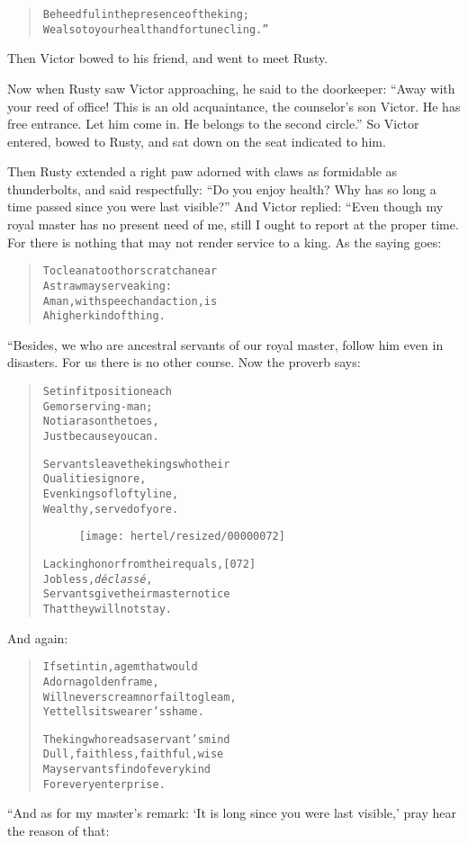 \documentclass[article, twoside, 10pt]{memoir}
\renewenvironment{verbatim}{%
\begin{quote}%
\vskip -10pt%
\begin{alltt}\normalfont\small}{\end{alltt}%
\end{quote}%
\vskip -10pt
} %
\begin{document}
\begin{verbatim}
Be heedful in the presence of the king;
We also to your health and fortune cling.”
\end{verbatim}
Then Victor bowed to his friend, and went to meet Rusty.

Now when Rusty saw Victor approaching, he said to the doorkeeper:
``Away with your reed of office! This is an old acquaintance, the counselor's son Victor. He has free entrance. Let him come in. He belongs to the second circle.''
So Victor entered, bowed to Rusty, and sat down on the seat
indicated to him.

Then Rusty extended a right paw adorned with claws as formidable as
thunderbolts, and said respectfully:
``Do you enjoy health? Why has so long a time passed since you were last visible?''
And Victor replied: “Even though my royal master has no present
need of me, still I ought to report at the proper time. For there
is nothing that may not render service to a king. As the saying
goes:

\begin{verbatim}
To clean a tooth or scratch an ear
    A straw may serve a king:
A man, with speech and action, is
    A higher kind of thing.
\end{verbatim}
“Besides, we who are ancestral servants of our royal master, follow
him even in disasters. For us there is no other course. Now the
proverb says:

\begin{verbatim}
Set in fit position each
    Gem or serving-man;
No tiaras on the toes,
    Just because you can.

Servants leave the kings who their
    Qualities ignore,
Even kings of lofty line,
    Wealthy, served of yore.
\begin{figure}[p]\texttt{[image: hertel/resized/00000072]}\end{figure}Lacking honor from their equals,                        [072]
    Jobless, \emph{déclassé},
Servants give their master notice
    That they will not stay.
\end{verbatim}
And again:

\begin{verbatim}
If set in tin, a gem that would
    Adorn a golden frame,
Will never scream nor fail to gleam,
    Yet tells its wearer's shame.

The king who reads a servant's mind{\textemdash}
    Dull, faithless, faithful, wise{\textemdash}
May servants find of every kind
    For every enterprise.
\end{verbatim}
“And as for my master's remark:
`It is long since you were last visible,' pray hear the reason of
that:
\end{document}

